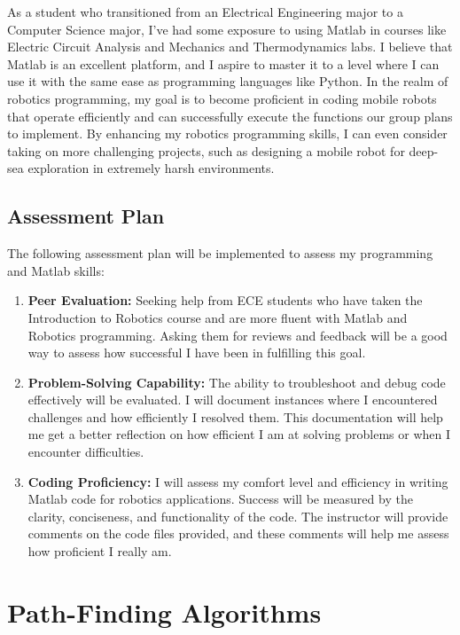 \documentclass[12pt]{article}
\begin{document}
As a student who transitioned from an Electrical Engineering major to a Computer Science major, I've had some exposure to using Matlab in courses like Electric Circuit Analysis and Mechanics and Thermodynamics labs. I believe that Matlab is an excellent platform, and I aspire to master it to a level where I can use it with the same ease as programming languages like Python. In the realm of robotics programming, my goal is to become proficient in coding mobile robots that operate efficiently and can successfully execute the functions our group plans to implement. By enhancing my robotics programming skills, I can even consider taking on more challenging projects, such as designing a mobile robot for deep-sea exploration in extremely harsh environments.

\subsection{Assessment Plan}

The following assessment plan will be implemented to assess my programming and Matlab skills:

\begin{enumerate}
    \item \textbf{Peer Evaluation:} Seeking help from ECE students who have taken the Introduction to Robotics course and are more fluent with Matlab and Robotics programming. Asking them for reviews and feedback will be a good way to assess how successful I have been in fulfilling this goal. 

    \item \textbf{Problem-Solving Capability:} The ability to troubleshoot and debug code effectively will be evaluated. I will document instances where I encountered challenges and how efficiently I resolved them. This documentation will help me get a better reflection on how efficient I am at solving problems or when I encounter difficulties.

    \item \textbf{Coding Proficiency:} I will assess my comfort level and efficiency in writing Matlab code for robotics applications. Success will be measured by the clarity, conciseness, and functionality of the code. The instructor will provide comments on the code files provided, and these comments will help me assess how proficient I really am. 
\end{enumerate}

\section{Path-Finding Algorithms}
\end{document}
